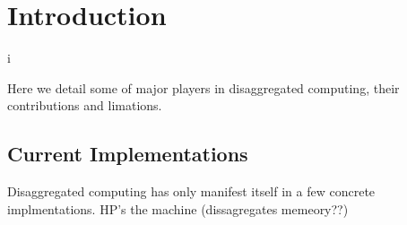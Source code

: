 \section{Introduction}
\label{sec:intro}i

Here we detail some of major players in disaggregated computing, their contributions and limations.

\subsection{Current Implementations}

Disaggregated computing has only manifest itself in a few concrete implmentations. HP's the machine (dissagregates memeory??)
